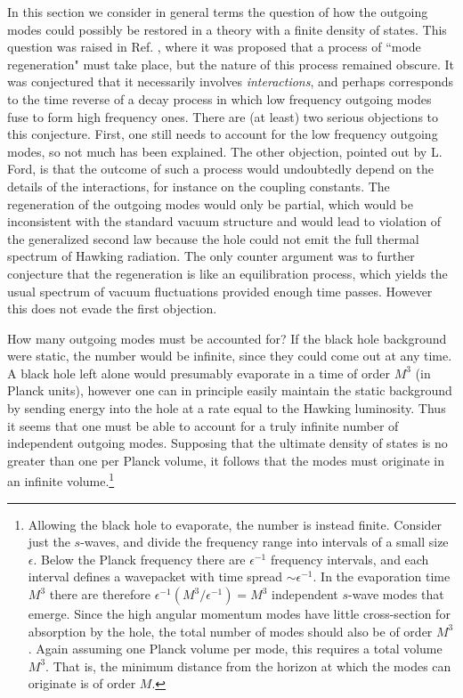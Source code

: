 In this section we consider in general terms the question of how the
outgoing modes could possibly be restored in a theory with a finite
density of states.  This question was raised in Ref. \cite{Jaco1},
where it was proposed that a process of ``mode regeneration" must take
place, but the nature of this process remained obscure.  It was
conjectured that it necessarily involves {\it interactions}, and
perhaps corresponds to the time reverse of a decay process in which low
frequency outgoing modes fuse to form high frequency ones.  There are
(at least) two serious objections to this conjecture.  First, one still
needs to account for the low frequency outgoing modes, so not much has
been explained. The other objection, pointed out by L.
Ford\cite{Fordpc}, is that the outcome of such a process would
undoubtedly depend on the details of the interactions, for instance on
the coupling constants. The regeneration of the outgoing modes would
only be partial, which would be inconsistent with the standard vacuum
structure and would lead to violation of the generalized second law
because the hole could not emit the full thermal spectrum of Hawking
radiation. The only counter argument\cite{Jaco1} was to further
conjecture that the regeneration is like an equilibration process,
which yields the usual spectrum of vacuum fluctuations provided enough
time passes.  However this does not evade the first objection.

How many outgoing modes must be accounted for? If the black hole
background were static, the number would be infinite, since they could
come out at any time. A black hole left alone would presumably
evaporate in a time of order $M^3$ (in Planck units), however one can
in principle easily maintain the static background by sending energy
into the hole at a rate equal to the Hawking luminosity. Thus it seems
that one must be able to account for a truly infinite number of
independent outgoing modes.  Supposing that the ultimate density of
states is no greater than one per Planck volume, it follows that the
modes must originate in an infinite volume.\footnote{Allowing the black
hole to evaporate, the number is instead finite. Consider just the
$s$-waves, and divide the frequency range into intervals of a small
size $\epsilon$. Below the Planck frequency there are ${\epsilon}^{-1}$
frequency intervals, and each interval defines a wavepacket with time
spread $\sim {\epsilon}^{-1}$. In the evaporation time $M^3$ there are
therefore ${\epsilon}^{-1}(M^3/{\epsilon}^{-1})=M^3$ independent
$s$-wave modes that emerge. Since the high angular momentum modes have
little cross-section for absorption by the hole, the total number of
modes should also be of order $M^3$. Again assuming one Planck volume
per mode, this requires a total volume $M^3$.  That is, the minimum
distance from the horizon at which the modes can originate is of order
$M$.}

